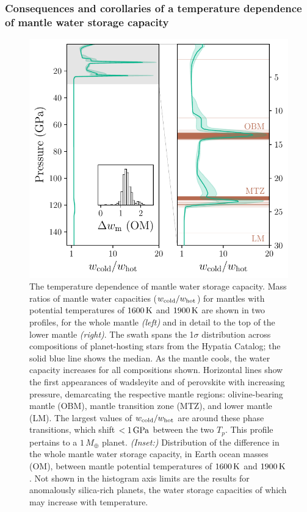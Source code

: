 \documentclass[fleqn,usenatbib]{mnras}
\begin{document}




\subsubsection{Consequences and corollaries of a temperature dependence of mantle water storage capacity}
\label{sec:discussion-temperature}


\begin{figure}
    \centering
    \includegraphics[width=\columnwidth]{sat_T_diff.pdf}
    \caption{The temperature dependence of mantle water storage capacity. Mass ratios of mantle water capacities ($w_{\rm cold}/w_{\rm hot}$) for mantles with potential temperatures of $1600\,{\rm K}$ and $1900\,{\rm K}$ are shown in two profiles, for the whole mantle \textit{(left)} and in detail to the top of the lower mantle \textit{(right)}. The swath spans the 1$\sigma$ distribution across compositions of planet-hosting stars from the Hypatia Catalog; the solid blue line shows the median. As the mantle cools, the water capacity increases for all compositions shown. Horizontal lines show the first appearances of wadsleyite and of perovskite with increasing pressure, demarcating the respective mantle regions: olivine-bearing mantle (OBM), mantle transition zone (MTZ), and lower mantle (LM). The largest values of $w_{\rm cold}/w_{\rm hot}$ are around these phase transitions, which shift $<1\,{\rm GPa}$ between the two $T_p$. This profile pertains to a $1\,M_\oplus$ planet. \textit{(Inset:)} Distribution of the difference in the whole mantle water storage capacity, in Earth ocean masses (OM), between mantle potential temperatures of $1600\,{\rm K}$ and $1900\,{\rm K}$. Not shown in the histogram axis limits are the results for anomalously silica-rich planets, the water storage capacities of which may increase with temperature.}
    \label{fig:sat_diff_T}
\end{figure}
\end{document}
